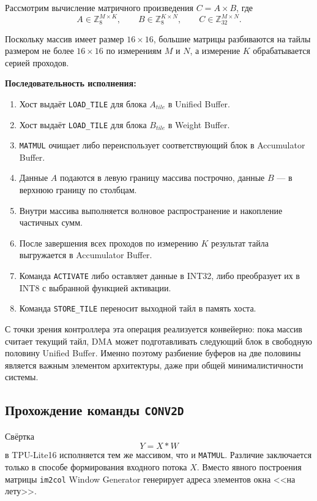 \documentclass[12pt,a4paper]{article}
\begin{document}
Рассмотрим вычисление матричного произведения \(C = A \times B\), где
\[
A \in \mathbb{Z}_8^{M \times K}, \qquad B \in \mathbb{Z}_8^{K \times N}, \qquad C \in \mathbb{Z}_{32}^{M \times N}.
\]

Поскольку массив имеет размер \(16 \times 16\), большие матрицы разбиваются на тайлы размером не более \(16 \times 16\) по измерениям \(M\) и \(N\), а измерение \(K\) обрабатывается серией проходов.

\textbf{Последовательность исполнения:}
\begin{enumerate}
    \item Хост выдаёт \texttt{LOAD\_TILE} для блока \(A_{tile}\) в Unified Buffer.
    \item Хост выдаёт \texttt{LOAD\_TILE} для блока \(B_{tile}\) в Weight Buffer.
    \item \texttt{MATMUL} очищает либо переиспользует соответствующий блок в Accumulator Buffer.
    \item Данные \(A\) подаются в левую границу массива построчно, данные \(B\) --- в верхнюю границу по столбцам.
    \item Внутри массива выполняется волновое распространение и накопление частичных сумм.
    \item После завершения всех проходов по измерению \(K\) результат тайла выгружается в Accumulator Buffer.
    \item Команда \texttt{ACTIVATE} либо оставляет данные в INT32, либо преобразует их в INT8 с выбранной функцией активации.
    \item Команда \texttt{STORE\_TILE} переносит выходной тайл в память хоста.
\end{enumerate}

С точки зрения контроллера эта операция реализуется конвейерно: пока массив считает текущий тайл, DMA может подготавливать следующий блок в свободную половину Unified Buffer. Именно поэтому разбиение буферов на две половины является важным элементом архитектуры, даже при общей минималистичности системы.

\subsection{Прохождение команды \texttt{CONV2D}}

Свёртка
\[
Y = X * W
\]
в TPU-Lite16 исполняется тем же массивом, что и \texttt{MATMUL}. Различие заключается только в способе формирования входного потока \(X\). Вместо явного построения матрицы \texttt{im2col} Window Generator генерирует адреса элементов окна <<на лету>>.
\end{document}
